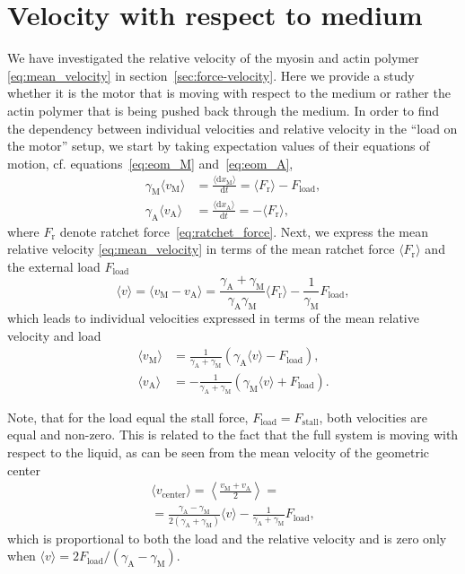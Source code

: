 \documentclass[aps,pre,twocolumn,showpacs,showkeys,superscriptaddress,floatfix]{revtex4-1}
\newcommand{\rmd}{{\mathrm d}}
\begin{document}
\section{Velocity with respect to medium}
\label{sec:ind_velo}
We have investigated the relative velocity of the myosin and actin polymer \eqref{eq:mean_velocity} in section~\ref{sec:force-velocity}. 
Here we provide a study whether it is the motor that is moving with respect to the medium or rather the actin polymer that is being pushed back through the medium.
In order to find the dependency between individual velocities and relative velocity in the ``load on the motor'' setup, 
we start by taking expectation values of their equations of motion, cf. equations~\eqref{eq:eom_M} and~\eqref{eq:eom_A},
\begin{align}
\gamma_\text{M} \langle v_\text{M} \rangle &= \frac{ \langle \rmd x_\text{M} \rangle }{\rmd t} = \langle F_\text{r} \rangle - F_\text{load} , 
\label{eq:pre_velocity_M} 
\\
\gamma_\text{A} \langle v_\text{A} \rangle &= \frac{ \langle \rmd x_\text{A} \rangle }{\rmd t} = -\langle F_\text{r} \rangle , 
\label{eq:pre_velocity_A}
\end{align}
where $F_\text{r}$ denote ratchet force~\eqref{eq:ratchet_force}. 
Next, we express the mean relative velocity \eqref{eq:mean_velocity} in terms of the mean ratchet force $\langle F_\text{r} \rangle$ and the external load $F_\text{load}$  
\begin{equation}
\langle v \rangle 
= \langle v_\text{M} - v_\text{A} \rangle 
= \frac{\gamma_\text{A} + \gamma_\text{M}}{\gamma_\text{A} \gamma_\text{M}} \langle F_\text{r} \rangle - \frac{1}{\gamma_\text{M}} F_\text{load} ,
\label{eq:mean_velocity_Fr_Fl}
\end{equation}
which leads to individual velocities expressed in terms of the mean relative velocity and load 
\begin{align}
\langle v_\text{M} \rangle &= \frac{1}{ \gamma_\text{A} + \gamma_\text{M} } \left( \gamma_\text{A} \langle v \rangle - F_\text{load} \right) ,
\label{eq:velocity_M} \\
\langle v_\text{A} \rangle &= -\frac{1}{ \gamma_\text{A} + \gamma_\text{M} } \left( \gamma_\text{M} \langle v \rangle + F_\text{load} \right) .
\label{eq:velocity_A}
\end{align}

Note, that for the load equal the stall force, $F_\text{load} = F_\text{stall}$, both velocities are equal and non-zero.
This is related to the fact that the full system is moving with respect to the liquid, as can be seen from the mean velocity of the geometric center 
\begin{multline*}
\langle v_\text{center} \rangle = \left\langle \frac{ v_\text{M} + v_\text{A} }{2} \right\rangle 
= \\
= \frac{ \gamma_\text{A} - \gamma_\text{M} }{ 2 ( \gamma_\text{A} + \gamma_\text{M} ) } \langle v \rangle - \frac{1}{ \gamma_\text{A} + \gamma_\text{M} } F_\text{load}
, 
\end{multline*}
which is proportional to both the load and the relative velocity and is zero only when $\langle v \rangle = 2 F_\text{load} / ( \gamma_\text{A} - \gamma_\text{M} )$.
\end{document}
